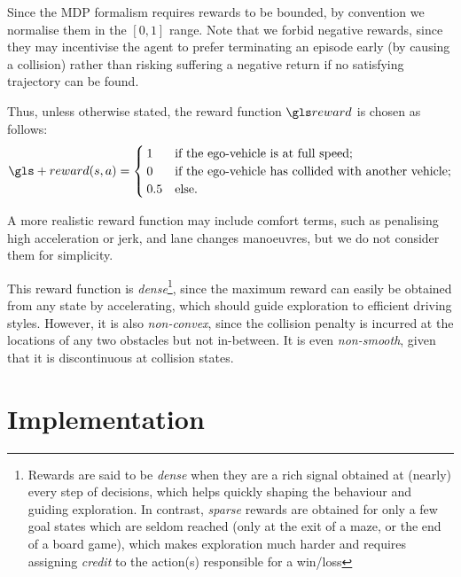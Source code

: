 Since the \gls{MDP} formalism requires rewards to be bounded, by convention we normalise them in the $[0, 1]$ range.
Note that we forbid negative rewards, since they may incentivise the agent to prefer terminating an episode early (by causing a collision) rather than risking suffering a negative return if no satisfying trajectory can be found.

Thus, unless otherwise stated, the reward function $\R$ is chosen as follows:
\begin{equation}
\label{eq:reward-function}
\gls+{reward}(s,a) = 
\begin{cases}
1 & \text{if the ego-vehicle is at full speed;}\\
0 & \text{if the ego-vehicle has collided with another vehicle;}\\
0.5 & \text{else.}
\end{cases}
\end{equation}

A more realistic reward function may include comfort terms, such as penalising high acceleration or jerk, and lane changes manoeuvres, but we do not consider them for simplicity.

This reward function is \emph{dense}\footnote{Rewards are said to be \emph{dense} when they are a rich signal obtained at (nearly) every step of decisions, which helps quickly shaping the behaviour and guiding exploration. In contrast, \emph{sparse} rewards are obtained for only a few goal states which are seldom reached (\eg only at the exit of a maze, or the end of a board game), which makes exploration much harder and requires assigning \emph{credit} to the action(s) responsible for a win/loss}, since the maximum reward can easily be obtained from any state by accelerating, which should guide exploration to efficient driving styles. However, it is also \emph{non-convex}, since \eg the collision penalty is incurred at the locations of any two obstacles but not in-between. It is even \emph{non-smooth}, given that it is discontinuous at collision states.

\section{Implementation}

